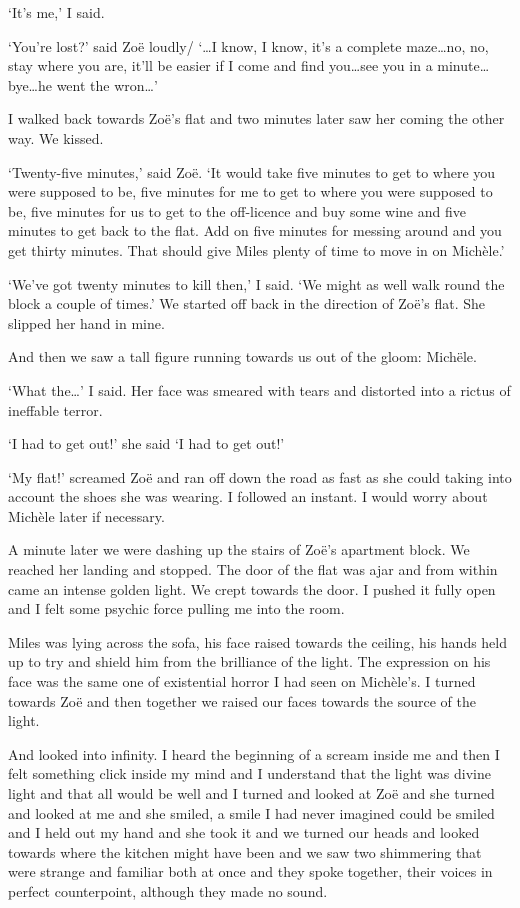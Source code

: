 `It's me,' I said.

`You're lost?' said Zo{\"e} loudly/ `\dots I know, I know, it's a
complete maze\dots no, no, stay where you are, it'll be easier if I
come and find you\dots see you in a minute\dots bye\dots he went the
wron\dots'

I walked back towards Zo{\"e}'s flat and two minutes later saw her
coming the other way. We kissed.

`Twenty-five minutes,' said Zo{\"e}. `It would take five minutes to get to
where you were supposed to be, five minutes for me to get to where
you were supposed to be, five minutes for us to get to the
off-licence and buy some wine and five minutes to get back to the
flat. Add on five minutes for messing around and you get thirty
minutes. That should give Miles plenty of time to move in on
Mich{\`e}le.'

`We've got twenty minutes to kill then,' I said. `We might as well
walk round the block a couple of times.' We started off back in the
direction of Zo{\"e}'s flat. She slipped her hand in mine.

And then we saw a tall figure running towards us out of the gloom:
Mich{\"e}le.

`What the\dots' I said. Her face was smeared with tears and
distorted into a rictus of ineffable terror.

`I had to get out!' she said `I had to get out!'

`My flat!' screamed Zo{\"e} and ran off down the road as fast as she
could taking into account the shoes she was wearing. I followed an
instant. I would worry about Mich{\`e}le later if necessary.

A minute later we were dashing up the stairs of Zo{\"e}'s apartment
block. We reached her landing and stopped. The door of the flat was
ajar and from within came an intense golden light. We crept towards
the door. I pushed it fully open and I felt some psychic force
pulling me into the room.

Miles was lying across the sofa, his face raised towards the
ceiling, his hands held up to try and shield him from the brilliance
of the light. The expression on his face was the same one of
existential horror I had seen on Mich{\`e}le's. I turned towards
Zo{\"e} and then together we raised our faces towards the source of
the light.

And looked into infinity. I heard the beginning of a scream inside
me and then I felt something {\twelveit click\/} inside my mind and
I understand that the light was divine light and that all would be
well and I turned and looked at Zo{\"e} and she turned and looked at
me and she smiled, a smile I had never imagined could be smiled and
I held out my hand and she took it and we turned our heads and
looked towards where the kitchen might have been and we saw two
shimmering that were strange and familiar both at once and they
spoke together, their voices in perfect counterpoint, although they
made no sound.

